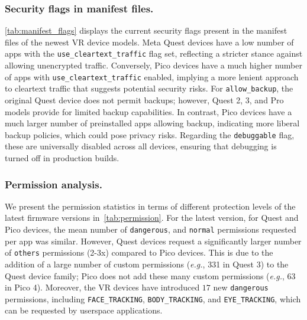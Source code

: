 \documentclass[sigconf]{acmart}
\newcommand{\cc}[1]{\mbox{\smaller[0.5]\texttt{#1}}}
\newcommand{\eg}{\emph{e.g.}\xspace}
\begin{document}
\subsubsection{Security flags in manifest files.}
\autoref{tab:manifest_flags} displays the current security flags present in the manifest files of the newest VR device models. 
Meta Quest devices have a low number of apps with the \cc{use\_cleartext\_traffic} flag set, reflecting a stricter stance against allowing unencrypted traffic.
Conversely, Pico devices have a much higher number of apps with \cc{use\_cleartext\_traffic} enabled, implying a more lenient approach to cleartext traffic that suggests potential security risks. 
For \cc{allow\_backup}, the original Quest device does not permit backups; however, Quest 2, 3, and Pro models provide for limited backup capabilities. In contrast, Pico devices have a much larger number of preinstalled apps allowing backup, indicating more liberal backup policies, which could pose privacy risks. Regarding the \cc{debuggable} flag, these are universally disabled across all devices, ensuring that debugging is turned off in production builds. 

\subsubsection{Permission analysis.}

We present the permission statistics in terms of different protection levels of the latest firmware versions in~\autoref{tab:permission}.
For the latest version, for Quest and Pico devices, the mean number of \cc{dangerous}, and \cc{normal} permissions requested per app was similar.
However,  Quest devices request a significantly larger number of \cc{others} permissions (2-3x) compared to Pico devices.  
This is due to the addition of a large number of custom permissions (\eg, 331 in Quest 3) to the Quest device family; 
Pico does not add these many custom permissions (\eg, 63 in Pico 4).
Moreover, the VR devices have introduced $17$ new \cc{dangerous} permissions, including \cc{FACE\_TRACKING}, \cc{BODY\_TRACKING}, and \cc{EYE\_TRACKING},
which can be requested by userspace applications. 
\end{document}
